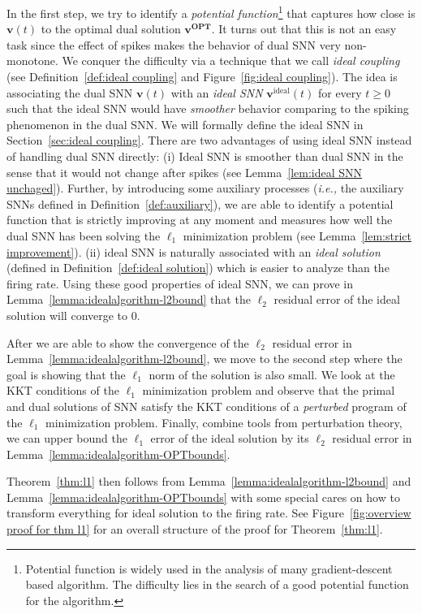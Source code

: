 \documentclass[11pt]{article}
\theoremstyle{remark}
\theoremstyle{definition}
\newcommand{\bv}{\mathbf{v}}
\newcommand{\OPT}{\mathbf{OPT}}
\begin{document}
In the first step, we try to identify a \textit{potential function}\footnote{Potential function is widely used in the analysis of many gradient-descent based algorithm. The difficulty lies in the search of a good potential function for the algorithm.} that captures how close is $\bv(t)$ to the optimal dual solution $\bv^\OPT$.
It turns out that this is not an easy task since the effect of spikes makes the behavior of dual SNN very non-monotone. We conquer the difficulty via a technique that we call \textit{ideal coupling} (see Definition~\ref{def:ideal coupling} and Figure~\ref{fig:ideal coupling}). The idea is associating the dual SNN $\bv(t)$ with an \textit{ideal SNN} $\bv^\text{ideal}(t)$ for every $t\geq0$ such that the ideal SNN would have \textit{smoother} behavior comparing to the spiking phenomenon in the dual SNN. We will formally define the ideal SNN in Section~\ref{sec:ideal coupling}. There are two advantages of using ideal SNN instead of handling dual SNN directly: 
(i) Ideal SNN is smoother than dual SNN in the sense that it would not change after spikes (see Lemma~\ref{lem:ideal SNN unchaged}). Further, by introducing some auxiliary processes (\textit{i.e.,} the auxiliary SNNs defined in Definition~\ref{def:auxiliary}), we are able to identify a potential function that is strictly improving at any moment and measures how well the dual SNN has been solving the $\ell_1$ minimization problem (see Lemma~\ref{lem:strict improvement}). 
(ii) ideal SNN is naturally associated with an \textit{ideal solution} (defined in Definition~\ref{def:ideal solution}) which is easier to analyze than the firing rate. Using these good properties of ideal SNN, we can prove in Lemma~\ref{lemma:idealalgorithm-l2bound} that the $\ell_2$ residual error of the ideal solution will converge to $0$.

After we are able to show the convergence of the $\ell_2$ residual error in Lemma~\ref{lemma:idealalgorithm-l2bound}, we move to the second step where the goal is showing that the $\ell_1$ norm of the solution is also small. We look at the KKT conditions of the $\ell_1$ minimization problem and observe that the primal and dual solutions of SNN satisfy the KKT conditions of a \textit{perturbed} program of the $\ell_1$ minimization problem. Finally, combine tools from perturbation theory, we can upper bound the $\ell_1$ error of the ideal solution by its $\ell_2$ residual error in Lemma~\ref{lemma:idealalgorithm-OPTbounds}.

Theorem~\ref{thm:l1} then follows from Lemma~\ref{lemma:idealalgorithm-l2bound} and Lemma~\ref{lemma:idealalgorithm-OPTbounds} with some special cares on how to transform everything for ideal solution to the firing rate. See Figure~\ref{fig:overview proof for thm l1} for an overall structure of the proof for Theorem~\ref{thm:l1}.
\end{document}
